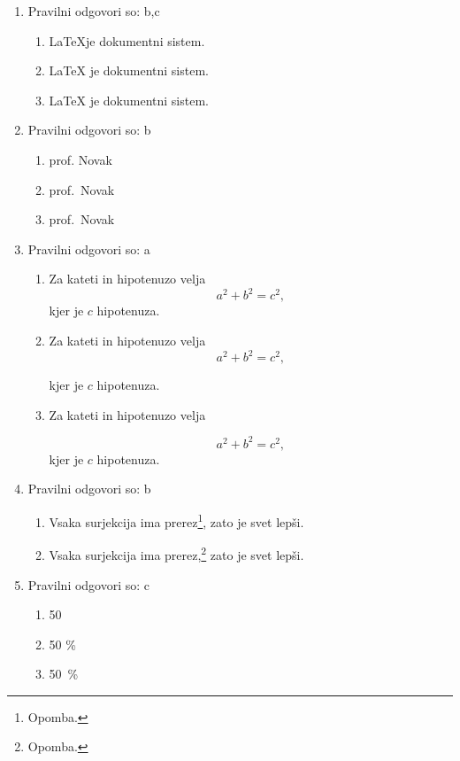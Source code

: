 \documentclass[11pt]{article}
\begin{document}
\begin{enumerate}
    \item Pravilni odgovori so: b,c%
    \begin{enumerate}
        \item \LaTeX je dokumentni sistem.
        \item {\LaTeX} je dokumentni sistem.
        \item \LaTeX{} je dokumentni sistem.
    \end{enumerate}

    \item Pravilni odgovori so: b%
    \begin{enumerate}
        \item prof. Novak
        \item prof.~Novak
        \item prof.\ Novak
    \end{enumerate}

    \item Pravilni odgovori so: a%
    \begin{enumerate}
        \item
Za kateti in hipotenuzo velja
\[
  a^2 + b^2 = c^2,
\]
kjer je \(c\) hipotenuza.
        \item
Za kateti in hipotenuzo velja
\[
  a^2 + b^2 = c^2,
\]

kjer je \(c\) hipotenuza.
        \item
Za kateti in hipotenuzo velja

\[
  a^2 + b^2 = c^2,
\]
kjer je \(c\) hipotenuza.
    \end{enumerate}

    \item Pravilni odgovori so: b%
    \begin{enumerate}
        \item Vsaka surjekcija ima prerez\footnote{Opomba.}, zato je svet lepši.
        \item Vsaka surjekcija ima prerez,\footnote{Opomba.} zato je svet lepši.
    \end{enumerate}

    \item Pravilni odgovori so: c%
    \begin{enumerate}
        \item 50 %
        \item 50 \%
        \item 50~\%
    \end{enumerate}


\end{enumerate}
\end{document}
